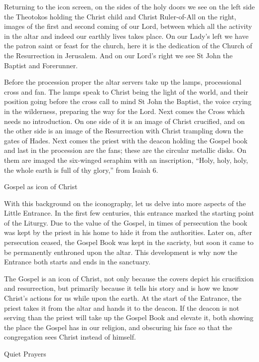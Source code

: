 \documentclass[
]{article}
\begin{document}
Returning to the icon screen, on the sides of the holy doors we see on
the left side the Theotokos holding the Christ child and Christ
Ruler-of-All on the right, images of the first and second coming of our
Lord, between which all the activity in the altar and indeed our earthly
lives takes place. On our Lady's left we have the patron saint or feast
for the church, here it is the dedication of the Church of the
Resurrection in Jerusalem. And on our Lord's right we see St John the
Baptist and Forerunner.

Before the procession proper the altar servers take up the lamps,
processional cross and fan. The lamps speak to Christ being the light of
the world, and their position going before the cross call to mind St
John the Baptist, the voice crying in the wilderness, preparing the way
for the Lord. Next comes the Cross which needs no introduction. On one
side of it is an image of Christ crucified, and on the other side is an
image of the Resurrection with Christ trampling down the gates of Hades.
Next comes the priest with the deacon holding the Gospel book and last
in the procession are the fans; these are the circular metallic disks.
On them are imaged the six-winged seraphim with an inscription, ``Holy,
holy, holy, the whole earth is full of thy glory,'' from Isaiah 6.

Gospel as icon of Christ

With this background on the iconography, let us delve into more aspects
of the Little Entrance. In the first few centuries, this entrance marked
the starting point of the Liturgy. Due to the value of the Gospel, in
times of persecution the book was kept by the priest in his home to hide
it from the authorities. Later on, after persecution ceased, the Gospel
Book was kept in the sacristy, but soon it came to be permanently
enthroned upon the altar. This development is why now the Entrance both
starts and ends in the sanctuary.

The Gospel is an icon of Christ, not only because the covers depict his
crucifixion and resurrection, but primarily because it tells his story
and is how we know Christ's actions for us while upon the earth. At the
start of the Entrance, the priest takes it from the altar and hands it
to the deacon. If the deacon is not serving than the priest will take up
the Gospel Book and elevate it, both showing the place the Gospel has in
our religion, and obscuring his face so that the congregation sees
Christ instead of himself.

Quiet Prayers
\end{document}
